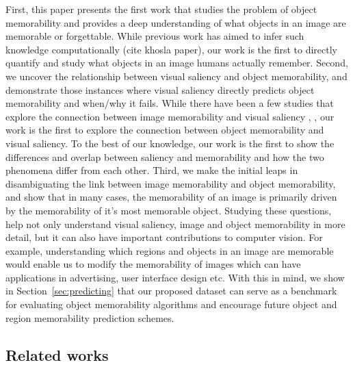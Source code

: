 First, this paper presents the first work that studies the problem of
object memorability and provides a deep understanding of what objects
in an image are memorable or forgettable. While previous work has
aimed to infer such knowledge  computationally (cite khosla paper),
our work is the first to directly quantify and study what objects in
an image humans actually remember.  
%
Second, we uncover the
relationship between visual saliency and object memorability, and
demonstrate those instances where visual saliency directly predicts
object memorability and when/why it fails. While there have been a few
studies that explore the connection between image memorability and
visual saliency \cite{zoya15}, \cite{lemeur13}, our work is the first
to explore the connection between object memorability and visual
saliency. To the best of our knowledge, our work is the first to show
the differences and overlap between saliency and memorability and how
the two phenomena differ from each other.
%
Third, we make the initial
leaps in disambiguating the link between image memorability and object
memorability, and show that in many cases, the memorability of an
image is primarily driven by the memorability of it’s most memorable
object. Studying these questions, help not only understand visual
saliency, image and object memorability in more detail, but it can
also have important contributions to computer vision. For example,
understanding which regions and objects in an image are memorable
would enable us to modify the memorability of images which can have
applications in advertising, user interface design etc. 
%
With this in mind, we show in Section~\ref{sec:predicting} that our
proposed dataset can serve as a benchmark for evaluating object
memorability algorithms and encourage future object and region
memorability prediction schemes. 


\subsection{Related works}
 